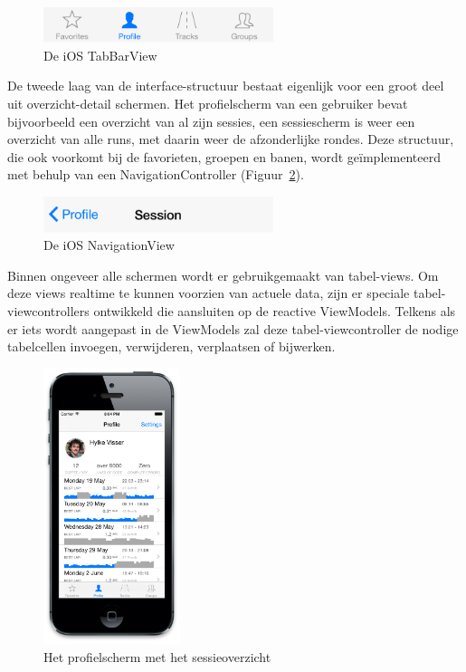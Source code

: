 \begin{figure}[h!t]
\centering
\includegraphics[width=0.6\textwidth]{style/images/TabView}
\caption{De iOS TabBarView}
\label{fig:tab-view}
\end{figure}

De tweede laag van de interface-structuur bestaat eigenlijk voor een groot deel uit overzicht-detail schermen. Het profielscherm van een gebruiker bevat bijvoorbeeld een overzicht van al zijn sessies, een sessiescherm is weer een overzicht van alle runs, met daarin weer de afzonderlijke rondes. Deze structuur, die ook voorkomt bij de favorieten, groepen en banen, wordt geïmplementeerd met behulp van een NavigationController (Figuur~\ref{fig:navigation-view}).

\begin{figure}[h!t]
\centering
\includegraphics[width=0.6\textwidth]{style/images/NavigationView}
\caption{De iOS NavigationView}
\label{fig:navigation-view}
\end{figure}

Binnen ongeveer alle schermen wordt er gebruikgemaakt van tabel-views. Om deze views realtime te kunnen voorzien van actuele data, zijn er speciale tabel-viewcontrollers ontwikkeld die aansluiten op de reactive ViewModels. Telkens als er iets wordt aangepast in de ViewModels zal deze tabel-viewcontroller de nodige tabelcellen invoegen, verwijderen, verplaatsen of bijwerken.

\begin{figure}
  \begin{center}
    \includegraphics[width=4cm]{style/images/screenshots/I-03-Home}
  \end{center}
  \caption{Het profielscherm met het sessieoverzicht}
  \label{fig:profiel-scherm}
\end{figure}

